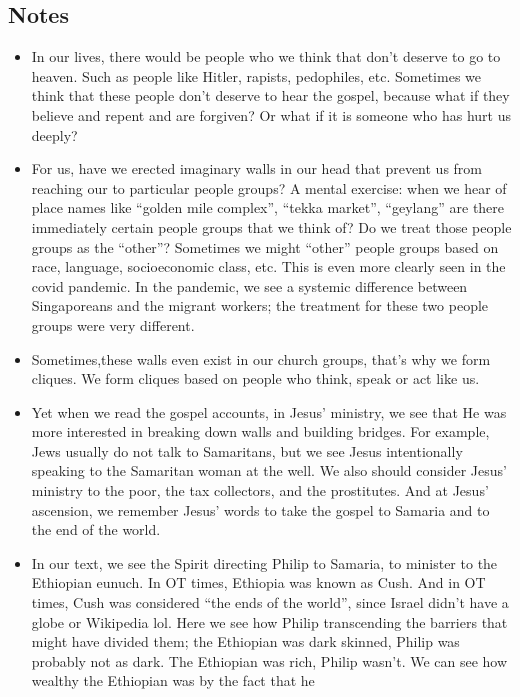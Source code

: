 \subsection*{Notes}
\begin{itemize}
  \item{In our lives, there would be people who we think that don't deserve
  to go to heaven. Such as people like Hitler, rapists, pedophiles, etc.
  Sometimes we think that these people don't deserve to hear the gospel,
  because what if they believe and repent and are forgiven? Or what if it is
  someone who has hurt us deeply?}
  \item{For us, have we erected imaginary walls in our head that prevent us
  from reaching our to particular people groups? A mental exercise: when we
  hear of place names like ``golden mile complex'', ``tekka market'',
  ``geylang'' are there immediately certain people groups that we think of?
  Do we treat those people groups as the ``other''? Sometimes we might
  ``other'' people groups based on race, language, socioeconomic class, etc.
  This is even more clearly seen in the covid pandemic. In the pandemic, we
  see a systemic difference between Singaporeans and the migrant workers; the
  treatment for these two people groups were very different.}
  \item{Sometimes,these walls even exist in our church groups, that's why we
  form cliques. We form cliques based on people who think, speak or act like
  us. }
  \item{Yet when we read the gospel accounts, in Jesus' ministry, we see that
  He was more interested in breaking down walls and building bridges. For
  example, Jews usually do not talk to Samaritans, but we see Jesus
  intentionally speaking to the Samaritan woman at the well. We also should
  consider Jesus' ministry to the poor, the tax collectors, and the
  prostitutes. And at Jesus' ascension, we remember Jesus' words to take the
  gospel to Samaria and to the end of the world.}
  \item{In our text, we see the Spirit directing Philip to Samaria, to
  minister to the Ethiopian eunuch. In OT times, Ethiopia was known as Cush.
  And in OT times, Cush was considered ``the ends of the world'', since
  Israel didn't have a globe or Wikipedia lol. Here we see how Philip
  transcending the barriers that might have divided them; the Ethiopian was
  dark skinned, Philip was probably not as dark. The Ethiopian was rich,
  Philip wasn't. We can see how wealthy the Ethiopian was by the fact that he
}
\end{itemize}
